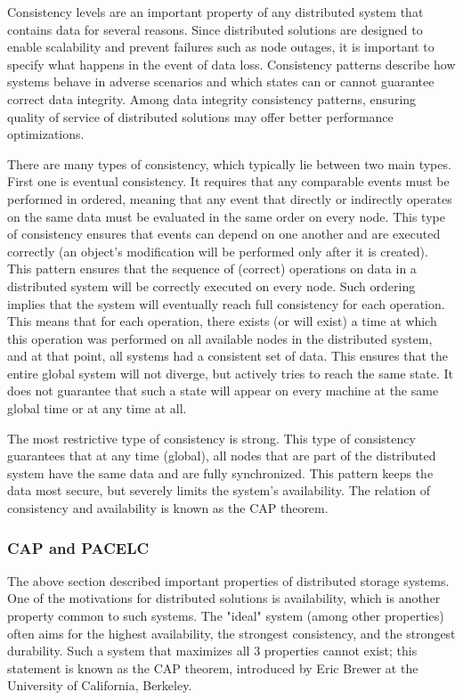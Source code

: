 Consistency levels are an important property of any distributed system that contains data for several reasons. Since distributed solutions are designed to enable scalability and prevent failures such as node outages, it is important to specify what happens in the event of data loss. Consistency patterns describe how systems behave in adverse scenarios and which states can or cannot guarantee correct data integrity. Among data integrity consistency patterns, ensuring quality of service of distributed solutions may offer better performance optimizations.

There are many types of consistency, which typically lie between two main types. First one is eventual consistency.
It requires that any comparable events must be performed in ordered, meaning that any event that directly or indirectly operates on the same data must be evaluated in the same order on every node. This type of consistency ensures that events can depend on one another and are executed correctly (an object's modification will be performed only after it is created). This pattern ensures that the sequence of (correct) operations on data in a distributed system will be correctly executed on every node. \cite{kleppmann_designing_2017} Such ordering implies that the system will eventually reach full consistency for each operation. This means that for each operation, there exists (or will exist) a time at which this operation was performed on all available nodes in the distributed system, and at that point, all systems had a consistent set of data. This ensures that the entire global system will not diverge, but actively tries to reach the same state. It does not guarantee that such a state will appear on every machine at the same global time or at any time at all.  \cite{kleppmann_designing_2017}

The most restrictive type of consistency is strong. This type of consistency guarantees that at any time (global), all nodes that are part of the distributed system have the same data and are fully synchronized. This pattern keeps the data most secure, but severely limits the system's availability. The relation of consistency and availability is known as the CAP theorem.  \cite{kleppmann_designing_2017, jepsen_authors_consistency_2025}
\subsubsection{CAP and PACELC}
The above section described important properties of distributed storage systems. One of the motivations for distributed solutions is availability, which is another property common to such systems. The "ideal" system (among other properties) often aims for the highest availability, the strongest consistency, and the strongest durability. Such a system that maximizes all 3 properties cannot exist; this statement is known as the CAP theorem, introduced by Eric Brewer at the University of California, Berkeley.\cite{brewer_cap_2012}

